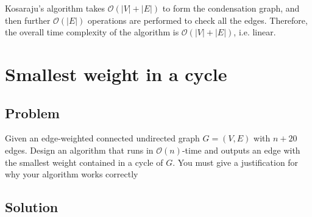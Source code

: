 \documentclass[12pt]{article}
\newenvironment{statement}{\color[rgb]{1.00,0.00,0.50} {}}{}
\begin{document}
Kosaraju's algorithm takes $\mathcal{O}(|V| + |E|)$ to form the condensation graph, and then further $\mathcal{O}(|E|)$ operations are performed to check all the edges. Therefore, the overall time complexity of the algorithm is $\mathcal{O}(|V| + |E|)$, i.e. linear.

\pagebreak

\section{Smallest weight in a cycle}

\subsection{Problem}

\begin{statement}
    Given an edge-weighted connected undirected graph $G = (V, E)$ with $n + 20$ edges.
Design an algorithm that runs in $\mathcal{O}(n)$-time and outputs an edge with the smallest weight contained in a cycle of $G$. You must give a justification for why your algorithm works correctly
\end{statement}




\subsection{Solution}
\end{document}
